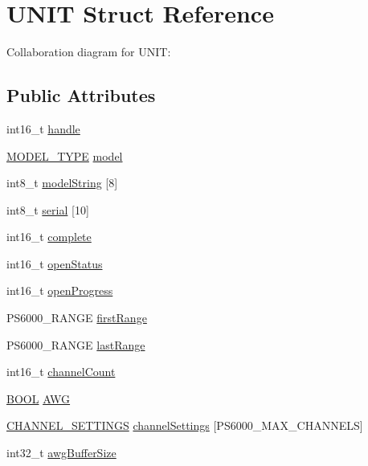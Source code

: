 \hypertarget{structUNIT}{}\section{U\+N\+IT Struct Reference}
\label{structUNIT}


Collaboration diagram for U\+N\+IT\+:
\subsection*{Public Attributes}
\begin{DoxyCompactItemize}
\item 
int16\+\_\+t \hyperlink{structUNIT_a86af0a0bb20d0fc653462a134d2240b0}{handle}
\item 
\hyperlink{ps6000con_8c_a04534293e3157cccde859fe44b3acfef}{M\+O\+D\+E\+L\+\_\+\+T\+Y\+PE} \hyperlink{structUNIT_acd52e761b4b80f6c7fa41c568adc2ff9}{model}
\item 
int8\+\_\+t \hyperlink{structUNIT_ab2969dd93f231ef64de2f8ff7f0a87aa}{model\+String} \mbox{[}8\mbox{]}
\item 
int8\+\_\+t \hyperlink{structUNIT_a8d4ab17004d27b2bd9713d4284a869b9}{serial} \mbox{[}10\mbox{]}
\item 
int16\+\_\+t \hyperlink{structUNIT_a1bbb2acad0a13147f08f7c0d5359b424}{complete}
\item 
int16\+\_\+t \hyperlink{structUNIT_a7bfb87b0c840cf00395e9a33f9d65d4d}{open\+Status}
\item 
int16\+\_\+t \hyperlink{structUNIT_a4ef6b7597dc29121c80710f01121bd79}{open\+Progress}
\item 
P\+S6000\+\_\+\+R\+A\+N\+GE \hyperlink{structUNIT_ac1ca29e3589bf0ab617d642ef575a54f}{first\+Range}
\item 
P\+S6000\+\_\+\+R\+A\+N\+GE \hyperlink{structUNIT_abeac45298b34288efaacd152ceffddc5}{last\+Range}
\item 
int16\+\_\+t \hyperlink{structUNIT_acf5a949860c98679c62e3ca601cfd5b1}{channel\+Count}
\item 
\hyperlink{ps6000con_8c_a4ea827f38bce5ec01d881a137ed5e3bb}{B\+O\+OL} \hyperlink{structUNIT_a51dcf07d6c80ef52175e6e814780bba7}{A\+WG}
\item 
\hyperlink{structCHANNEL__SETTINGS}{C\+H\+A\+N\+N\+E\+L\+\_\+\+S\+E\+T\+T\+I\+N\+GS} \hyperlink{structUNIT_aa51b9453b7a03cb4a3ba23de2497268f}{channel\+Settings} \mbox{[}P\+S6000\+\_\+\+M\+A\+X\+\_\+\+C\+H\+A\+N\+N\+E\+LS\mbox{]}
\item 
int32\+\_\+t \hyperlink{structUNIT_a4d8332ec4419a63c20e9bb7db0dd265f}{awg\+Buffer\+Size}
\end{DoxyCompactItemize}


